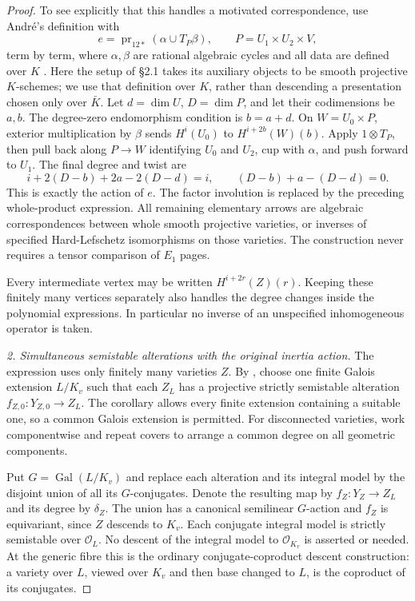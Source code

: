 \begin{proof}
To see explicitly that this handles a motivated correspondence,
use Andr\'e's definition with
\[
 e=\operatorname{pr}_{12*}(\alpha\cup T_P\beta),
 \qquad P=U_1\times U_2\times V,
\]
term by term, where $\alpha,\beta$ are rational algebraic cycles
and all data are defined over $K$
\citep[Definition~1, \S2.1, printed p.~14]{c_andre1996}.
Here the setup of \S2.1 takes its auxiliary objects to be smooth
projective $K$-schemes; we use that definition over $K$, rather
than descending a presentation chosen only over $\bar K$.
Let $d=\dim U$, $D=\dim P$, and let their codimensions be
$a,b$. The degree-zero endomorphism condition is $b=a+d$.
On $W=U_0\times P$, exterior multiplication by $\beta$ sends
$H^i(U_0)$ to $H^{i+2b}(W)(b)$. Apply $1\otimes T_P$, then
pull back along $P\to W$ identifying $U_0$ and $U_2$, cup with
$\alpha$, and push forward to $U_1$. The final degree and twist are
\[
 i+2(D-b)+2a-2(D-d)=i,
 \qquad (D-b)+a-(D-d)=0.
\]
This is exactly the action of $e$.
The factor involution is replaced by the preceding whole-product
expression. All remaining elementary arrows are algebraic
correspondences between whole smooth projective varieties, or
inverses of specified Hard-Lefschetz isomorphisms on those varieties.
The construction never requires a tensor comparison of $E_1$ pages.

Every intermediate vertex may be written
$H^{i+2r}(Z)(r)$. Keeping these finitely many vertices separately
also handles the degree changes inside the polynomial expressions.
In particular no inverse of an unspecified inhomogeneous operator
is taken.

\emph{2. Simultaneous semistable alterations with the original inertia action.}
The expression uses only finitely many varieties $Z$.
By \citet[Corollary~1.2.6, author p.~16]{c_saito2003weights},
choose one finite Galois extension $L/K_v$ such that each $Z_L$
has a projective strictly semistable alteration
$f_{Z,0}:Y_{Z,0}\to Z_L$.
The corollary allows every finite extension containing a suitable
one, so a common Galois extension is permitted.
For disconnected varieties, work componentwise and repeat covers
to arrange a common degree on all geometric components.

Put $G=\operatorname{Gal}(L/K_v)$ and replace each alteration
and its integral model by the disjoint union of all its $G$-conjugates.
Denote the resulting map by $f_Z:Y_Z\to Z_L$ and its degree by
$\delta_Z$. The union has a canonical semilinear $G$-action and
$f_Z$ is equivariant, since $Z$ descends to $K_v$.
Each conjugate integral model is strictly semistable over
$\mathcal O_L$. No descent of the integral model to
$\mathcal O_{K_v}$ is asserted or needed.
At the generic fibre this is the ordinary conjugate-coproduct
descent construction: a variety over $L$, viewed over $K_v$ and
then base changed to $L$, is the coproduct of its conjugates.


\end{proof}
